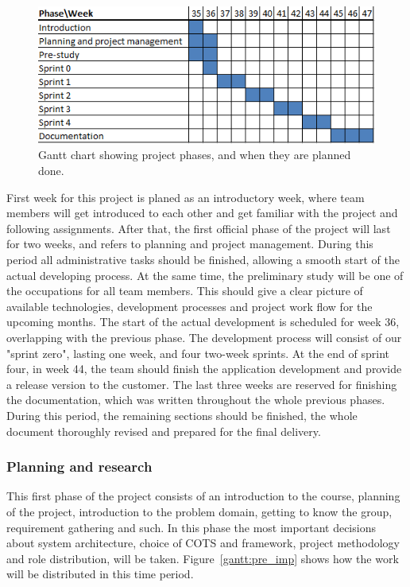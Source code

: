 \begin{figure}[h]
\centering
  \includegraphics[width=1.0\textwidth]{project_management/project_effort_estimation}
  \caption[Gantt chart of project phases]{Gantt chart showing project phases, and when they are planned done.}
  \label{gantt:project}
\end{figure}
First week for this project is planed as an introductory week, where team members will get introduced to each other and get familiar with the project and following assignments.
After that, the first official phase of the project will last for two weeks, and refers to planning and project management. 
During this period all administrative tasks should be finished, allowing a smooth start of the actual developing process. 
At the same time, the preliminary study will be one of the occupations for all team members. 
This should give a clear picture of available technologies, development processes and project work flow for the upcoming months.
The start of the actual development is scheduled for week 36, overlapping with the previous phase. 
The development process will consist of our "sprint zero", lasting one week, and four two-week sprints. 
At the end of sprint four, in week 44, the team should finish the application development and provide a release version to the customer.
The last three weeks are reserved for finishing the documentation, which was written throughout the whole previous phases. 
During this period, the remaining sections should be finished, the whole document thoroughly revised and prepared for the final delivery.

\subsubsection{Planning and research}

This first phase of the project consists of an introduction to the course,
planning of the project, introduction to the problem domain, getting to know
the group, requirement gathering and such. In this phase the most important
decisions about system architecture, choice of COTS and framework, project
methodology and role distribution, will be taken. Figure~\ref{gantt:pre_imp}
shows how the work will be distributed in this time period.

